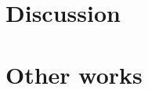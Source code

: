 \documentclass[twocolumn]{aastex631}
\begin{document}
\section{Discussion} 
\label{sec:conclusion}

\section{Other works}





\end{document}

